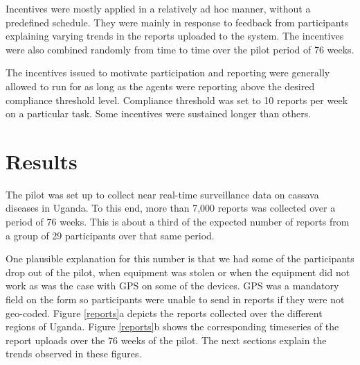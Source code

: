 \documentclass[letterpaper]{article} %
\begin{document}
Incentives were mostly applied in a relatively ad hoc manner, without a predefined schedule. They were mainly in response to feedback from participants explaining varying trends in the reports uploaded to the system. The incentives were also combined randomly from time to time over the pilot period of 76 weeks.

The incentives issued to motivate participation and reporting were generally allowed to run for as long as the agents were reporting above the desired compliance threshold level. Compliance threshold was set to 10 reports per week on a particular task. Some incentives were sustained longer than others.







\section{Results}
The pilot was set up to collect near real-time surveillance data on cassava diseases in Uganda. To this end, more than 7,000 reports was collected over a period of 76 weeks. This is about a third of the expected number of reports from a group of 29 participants over that same period.

One plausible explanation for this number is that we had some of the participants drop out of the pilot, when equipment was stolen or when the equipment did not work as was the case with GPS on some of the devices. GPS was a mandatory field on the form so participants were unable to send in reports if they were not geo-coded. Figure \ref{reports}a depicts the reports collected over the different regions of Uganda. Figure \ref{reports}b shows the corresponding timeseries of the report uploads over the 76 weeks of the pilot. The next sections explain the trends observed in these figures.
\end{document}
